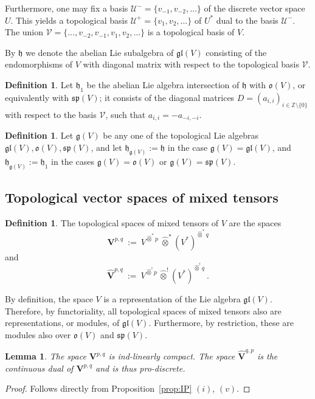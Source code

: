 \documentclass[12pt,reqno]{amsart}
\newtheorem{lem}[thm]{Lemma}
\theoremstyle{definition}
\newtheorem{defn}[thm]{Definition}
\theoremstyle{remark}
\begin{document}
	Furthermore, one may fix a basis $\mathcal{U}^- = \{v_{-1}, v_{-2}, \ldots\}$ of the discrete vector space $U$. This yields a topological basis $\mathcal{U}^+ = \{v_1 , v_2 , \ldots \}$ of $U^\ast$ dual to the basis $\mathcal{U}^-$. The union $\mathcal{V} = \{\ldots, v_{-2}, v_{-1}, v_1, v_2, \ldots\}$ is a topological basis of $V$.
	
	By $\mathfrak{h}$ we denote the abelian Lie subalgebra of $\mathfrak{gl}(V)$ consisting of the endomorphisms of $V$ with diagonal matrix with respect to the topological basis $\mathcal{V}$.

    \begin{defn}
        Let $\mathfrak{h}_1$ be the abelian Lie algebra intersection of $\mathfrak{h}$ with $\mathfrak{o}(V)$, or equivalently with $\mathfrak{sp}(V)$; it consists of the diagonal matrices $D = (a_{i,i})_{i\in \mathbb{Z}\setminus\{0\}}$ with respect to the basis $\mathcal{V}$, such that $a_{i,i} = -a_{-i, -i}$.
    \end{defn}
   

    \begin{defn}
        Let $\mathfrak{g}(V)$ be any one of the topological Lie algebras $\mathfrak{gl}(V), \mathfrak{o}(V), \mathfrak{sp}(V)$, and let $\mathfrak{h}_{\mathfrak{g}(V)} := \mathfrak{h}$ in the case $\mathfrak{g}(V) = \mathfrak{gl}(V)$, and  $\mathfrak{h}_{\mathfrak{g}(V)} := \mathfrak{h}_1$ in the cases $\mathfrak{g}(V) = \mathfrak{o}(V)$ or $\mathfrak{g}(V) = \mathfrak{sp}(V)$.
    \end{defn}

	
	\subsection{Topological vector spaces of mixed tensors}
	
	
	
	\begin{defn}
	The topological spaces of mixed tensors of $V$ are the spaces
	$$
	\mathbf{V}^{p,q} \ := \ V^{\widehat{\otimes}^\ast \! p}\  \widehat{\otimes}^\ast (V^\ast)^{\widehat{\otimes}^\ast \! q}
	$$
	and
	$$
	\widehat{\mathbf{V}}^{p,q} \ := \ V^{\widehat{\otimes}^! \! p\ } \widehat{\otimes}^! (V^\ast)^{\widehat{\otimes}^! \! q} 
	\ .
	$$
	\end{defn}
	By definition, the space $V$ is a representation of the Lie algebra $\mathfrak{gl}(V)$. Therefore, by functoriality, all topological spaces of  mixed tensors also are representations, or modules, of $\mathfrak{gl}(V)$. Furthermore, by restriction, these are  modules also over $\mathfrak{o}(V)$ and $\mathfrak{sp}(V)$.
	\begin{lem}
	The space $\mathbf{V}^{p,q}$ is ind-linearly compact. The space $\widehat{\mathbf{V}}^{q,p}$ is the continuous dual of $\mathbf{V}^{p,q}$ and is thus pro-discrete.
	\end{lem}
	\begin{proof}
Follows directly from Proposition~\ref{prop:IP} $(i)$, $(v)$.
	\end{proof}
\end{document}
